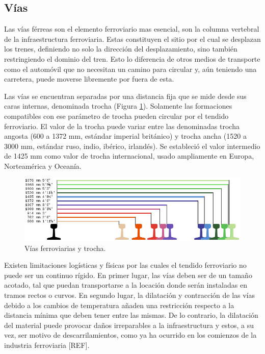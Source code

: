 \subsection{Vías}

    Las vías férreas son el elemento ferroviario mas esencial, son la columna vertebral de la infraestructura ferroviaria. Estas constituyen el sitio por el cual se desplazan los trenes, definiendo no solo la dirección del desplazamiento, sino también restringiendo el dominio del tren. Esto lo diferencia de otros medios de transporte como el automóvil que no necesitan un camino para circular y, aún teniendo una carretera, puede moverse libremente por fuera de esta.

    Las vías se encuentran separadas por una distancia fija que se mide desde sus caras internas, denominada trocha (Figura \ref{fig:vias_1}). Solamente las formaciones compatibles con ese parámetro de trocha pueden circular por el tendido ferroviario. El valor de la trocha puede variar entre las denominadas trocha angosta (600 a 1372 mm, estándar imperial británico) y trocha ancha (1520 a 3000 mm, estándar ruso, indio, ibérico, irlandés). Se estableció el valor intermedio de 1425 mm como valor de trocha internacional, usado ampliamente en Europa, Norteamérica y Oceanía.

    \begin{figure}[!h]
        \centering
        \includegraphics[width=1\textwidth]{Figuras/trocha.png}
        \centering\caption{Vías ferroviarias y trocha.}
        \label{fig:vias_1}
    \end{figure}
    
    Existen limitaciones logísticas y físicas por las cuales el tendido ferroviario no puede ser un continuo rígido. En primer lugar, las vías deben ser de un tamaño acotado, tal que puedan transportarse a la locación donde serán instaladas en tramos rectos o curvos. En segundo lugar, la dilatación y contracción de las vías debido a los cambios de temperatura añaden una restricción respecto a la distancia mínima que deben tener entre las mismas. De lo contrario, la dilatación del material puede provocar daños irreparables a la infraestructura y estos, a su vez, ser motivo de descarrilamientos, como ya ha ocurrido en los comienzos de la industria ferroviaria [REF]. 
    
